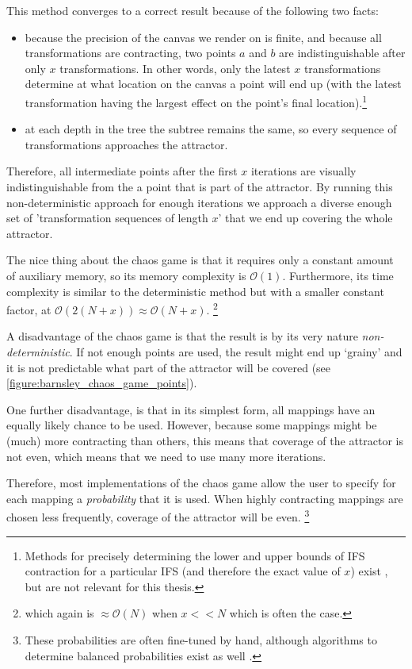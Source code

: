 \documentclass[11pt]{article}
\begin{document}
This method converges to a correct result because of the following two facts:

\begin{itemize}
\item because the precision of the canvas we render on is finite, and because all transformations are contracting,
two points \(a\) and \(b\) are indistinguishable after only \(x\) transformations.
 In other words, only the latest \(x\) transformations determine at what location on the canvas a point will end up (with the latest transformation having the largest effect on the point's final location).\footnote{Methods for precisely determining the lower and upper bounds of IFS contraction for a particular IFS (and therefore the exact value of \(x\)) exist \cite{hepting1991rendering}, 
but are not relevant for this thesis.}
\item at each depth in the tree the subtree remains the same, so every sequence of transformations approaches the attractor.
\end{itemize}

Therefore, all intermediate points after the first \(x\) iterations are visually indistinguishable from the a point that is part of the attractor.
By running this non-deterministic approach for enough iterations we approach a diverse enough set of 'transformation sequences of length \(x\)' that we end up covering the whole attractor.

The nice thing about the chaos game is that it requires only a constant amount of auxiliary memory, so its memory complexity is \(\mathcal{O}(1)\).
Furthermore, its time complexity is similar to the deterministic method but with a smaller constant factor, at \(\mathcal{O}(2(N + x)) \approx \mathcal{O}(N + x)\). \footnote{which again is \(\approx \mathcal{O}(N)\) when \(x << N\) which is often the case.}

A disadvantage of the chaos game is that the result is by its very nature \emph{non-deterministic}.
If not enough points are used, the result might end up `grainy' and it is not predictable what part of the attractor will be covered (see \autoref{figure:barnsley_chaos_game_points}).

One further disadvantage, is that in its simplest form, all mappings have an equally likely chance to be used.
However, because some mappings might be (much) more contracting than others, this means that coverage of the attractor is not even,
which means that we need to use many more iterations.

Therefore, most implementations of the chaos game allow the user to specify for each mapping a \emph{probability} that it is used. 
When highly contracting mappings are chosen less frequently, coverage of the attractor will be even. \footnote{These probabilities are often fine-tuned by hand, although algorithms to determine balanced probabilities exist as well \cite{hepting1991rendering}.}
\end{document}
